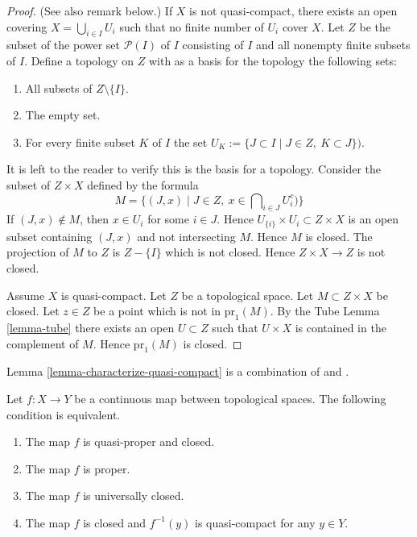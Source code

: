 \begin{proof}
(See also remark below.)
If $X$ is not quasi-compact, there exists an open covering
$X = \bigcup_{i \in I} U_i$ such that no finite
number of $U_i$ cover $X$.
Let $Z$ be the subset of the power set $\mathcal{P}(I)$ of $I$
consisting of $I$ and all nonempty finite subsets of $I$.
Define a topology on $Z$ with as a basis for the topology
the following sets:
\begin{enumerate}
\item All subsets of $Z\setminus\{I\}$.
\item The empty set.
\item For every finite subset $K$ of $I$ the set
$U_K := \{J\subset I \mid J \in Z, \ K\subset J \})$.
\end{enumerate}
It is left to the reader to verify this is the basis for a topology.
Consider the subset of $Z \times X$ defined by the formula
$$
M = \{(J, x) \mid J \in Z, \ x \in \bigcap\nolimits_{i \in J} U_i^c)\}
$$
If $(J, x) \not \in M$, then $x \in U_i$ for some $i \in J$.
Hence $U_{\{i\}} \times U_i \subset Z \times X$ is an open
subset containing $(J, x)$ and not intersecting $M$. Hence
$M$ is closed. The projection of $M$ to $Z$ is $Z-\{I\}$
which is not closed. Hence $Z \times X \to Z$ is not closed.

\medskip\noindent
Assume $X$ is quasi-compact. Let $Z$ be a topological space.
Let $M \subset  Z \times X$ be closed. Let $z \in Z$ be a point
which is not in $\text{pr}_1(M)$. By the Tube Lemma \ref{lemma-tube}
there exists an open $U \subset Z$ such that $U \times X$ is
contained in the complement of $M$. Hence $\text{pr}_1(M)$ is closed.
\end{proof}

\begin{remark}
\label{remark-lemma-literature}
Lemma \ref{lemma-characterize-quasi-compact} is a combination of
\cite[I, p. 75, Lemme 1]{Bourbaki} and
\cite[I, p. 76, Corrolaire 1]{Bourbaki}.
\end{remark}

\begin{theorem}
\label{theorem-characterize-proper}
Let $f: X\to Y$ be a continuous map between
topological spaces. The following condition is equivalent.
\begin{enumerate}
\item The map $f$ is quasi-proper and closed.
\item The map $f$ is proper.
\item The map $f$ is universally closed.
\item The map $f$ is closed and $f^{-1}(y)$ is quasi-compact for any
$y\in Y$.
\end{enumerate}
\end{theorem}

